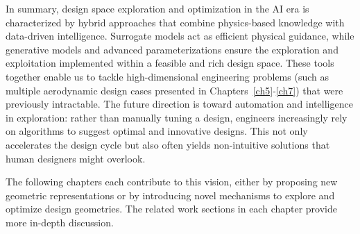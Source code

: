 In summary, design space exploration and optimization in the AI era is characterized by hybrid approaches that combine physics-based knowledge with data-driven intelligence. Surrogate models act as efficient physical guidance, while generative models and advanced parameterizations ensure the exploration and exploitation implemented within a feasible and rich design space. These tools together enable us to tackle high-dimensional engineering problems (such as multiple aerodynamic design cases presented in Chapters~\ref{ch5}-\ref{ch7}) that were previously intractable. The future direction is toward automation and intelligence in exploration: rather than manually tuning a design, engineers increasingly rely on algorithms to suggest optimal and innovative designs. This not only accelerates the design cycle but also often yields non-intuitive solutions that human designers might overlook.

The following chapters each contribute to this vision, either by proposing new geometric representations or by introducing novel mechanisms to explore and optimize design geometries. The related work sections in each chapter provide more in-depth discussion.